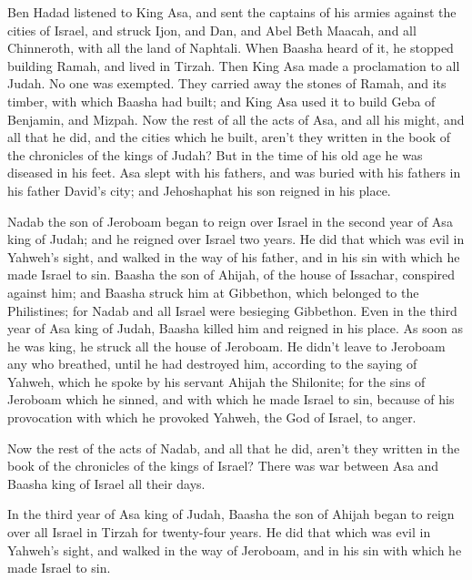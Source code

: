  Ben Hadad listened to King Asa, and sent the captains of
his armies against the cities of Israel, and struck Ijon, and Dan, and
Abel Beth Maacah, and all Chinneroth, with all the land of Naphtali.
 When Baasha heard of it, he stopped building Ramah, and
lived in Tirzah.  Then King Asa made a proclamation to
all Judah. No one was exempted. They carried away the stones of Ramah,
and its timber, with which Baasha had built; and King Asa used it to
build Geba of Benjamin, and Mizpah.  Now the rest of all
the acts of Asa, and all his might, and all that he did, and the cities
which he built, aren't they written in the book of the chronicles of the
kings of Judah? But in the time of his old age he was diseased in his
feet.  Asa slept with his fathers, and was buried with
his fathers in his father David's city; and Jehoshaphat his son reigned
in his place.

 Nadab the son of Jeroboam began to reign over Israel in
the second year of Asa king of Judah; and he reigned over Israel two
years.  He did that which was evil in Yahweh's sight, and
walked in the way of his father, and in his sin with which he made
Israel to sin.  Baasha the son of Ahijah, of the house of
Issachar, conspired against him; and Baasha struck him at Gibbethon,
which belonged to the Philistines; for Nadab and all Israel were
besieging Gibbethon.  Even in the third year of Asa king
of Judah, Baasha killed him and reigned in his place.  As
soon as he was king, he struck all the house of Jeroboam. He didn't
leave to Jeroboam any who breathed, until he had destroyed him,
according to the saying of Yahweh, which he spoke by his servant Ahijah
the Shilonite;  for the sins of Jeroboam which he sinned,
and with which he made Israel to sin, because of his provocation with
which he provoked Yahweh, the God of Israel, to anger.

 Now the rest of the acts of Nadab, and all that he did,
aren't they written in the book of the chronicles of the kings of
Israel?  There was war between Asa and Baasha king of
Israel all their days.

 In the third year of Asa king of Judah, Baasha the son
of Ahijah began to reign over all Israel in Tirzah for twenty-four
years.  He did that which was evil in Yahweh's sight, and
walked in the way of Jeroboam, and in his sin with which he made Israel
to sin.

